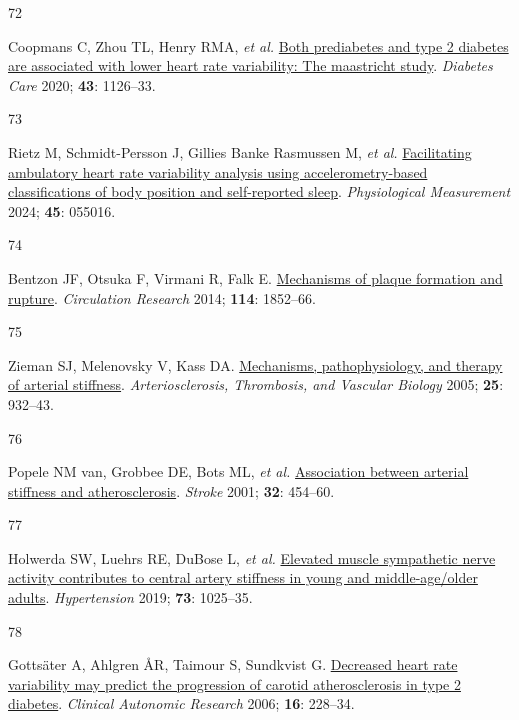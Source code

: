 \documentclass[
  a4paper,
  headsepline=true,
  open=any]{scrbook}
\newlength{\cslhangindent}
\newlength{\csllabelwidth}
\newlength{\cslentryspacingunit} %
\newenvironment{CSLReferences}[2] %
 {%
  \setlength{\parindent}{0pt}
  \ifodd #1
  \let\oldpar\par
  \def\par{\hangindent=\cslhangindent\oldpar}
  \fi
  \setlength{\parskip}{#2\cslentryspacingunit}
 }%
 {}
\newcommand{\CSLLeftMargin}[1]{\parbox[t]{\csllabelwidth}{#1}}
\newcommand{\CSLRightInline}[1]{\parbox[t]{\linewidth - \csllabelwidth}{#1}\break}
\begin{document}
\begin{CSLReferences}{0}{0}
\leavevmode{}%
\CSLLeftMargin{72 }%
\CSLRightInline{Coopmans C, Zhou TL, Henry RMA, \emph{et al.}
\href{https://doi.org/10.2337/dc19-2367}{Both prediabetes and type 2
diabetes are associated with lower heart rate variability: The
maastricht study}. \emph{Diabetes Care} 2020; \textbf{43}: 1126--33.}

\leavevmode{}%
\CSLLeftMargin{73 }%
\CSLRightInline{Rietz M, Schmidt-Persson J, Gillies Banke Rasmussen M,
\emph{et al.}
\href{https://doi.org/10.1088/1361-6579/ad450d}{Facilitating ambulatory
heart rate variability analysis using accelerometry-based
classifications of body position and self-reported sleep}.
\emph{Physiological Measurement} 2024; \textbf{45}: 055016.}

\leavevmode{}%
\CSLLeftMargin{74 }%
\CSLRightInline{Bentzon JF, Otsuka F, Virmani R, Falk E.
\href{https://doi.org/10.1161/CIRCRESAHA.114.302721}{Mechanisms of
plaque formation and rupture}. \emph{Circulation Research} 2014;
\textbf{114}: 1852--66.}

\leavevmode{}%
\CSLLeftMargin{75 }%
\CSLRightInline{Zieman SJ, Melenovsky V, Kass DA.
\href{https://doi.org/10.1161/01.ATV.0000160548.78317.29}{Mechanisms,
pathophysiology, and therapy of arterial stiffness}.
\emph{Arteriosclerosis, Thrombosis, and Vascular Biology} 2005;
\textbf{25}: 932--43.}

\leavevmode{}%
\CSLLeftMargin{76 }%
\CSLRightInline{Popele NM van, Grobbee DE, Bots ML, \emph{et al.}
\href{https://doi.org/10.1161/01.STR.32.2.454}{Association between
arterial stiffness and atherosclerosis}. \emph{Stroke} 2001;
\textbf{32}: 454--60.}

\leavevmode{}%
\CSLLeftMargin{77 }%
\CSLRightInline{Holwerda SW, Luehrs RE, DuBose L, \emph{et al.}
\href{https://doi.org/doi:10.1161/HYPERTENSIONAHA.118.12462}{Elevated
muscle sympathetic nerve activity contributes to central artery
stiffness in young and middle-age/older adults}. \emph{Hypertension}
2019; \textbf{73}: 1025--35.}

\leavevmode{}%
\CSLLeftMargin{78 }%
\CSLRightInline{Gottsäter A, Ahlgren ÅR, Taimour S, Sundkvist G.
\href{https://doi.org/10.1007/s10286-006-0345-4}{Decreased heart rate
variability may predict the progression of carotid atherosclerosis in
type 2 diabetes}. \emph{Clinical Autonomic Research} 2006; \textbf{16}:
228--34.}


\end{CSLReferences}
\end{document}
